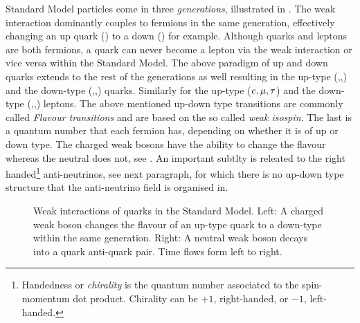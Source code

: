 Standard Model particles come in three {\it generations}, illustrated in .
The weak interaction dominantly couples to fermions in the same generation, effectively changing an up quark (\uquark) to a down (\dquark) for example.
Although quarks and leptons are both fermions, a quark can never become a lepton via the weak interaction or vice versa within the Standard Model.
The above paradigm of up and down quarks extends to the rest of the generations as well resulting in the up-type (\uquark,\cquark,\tquark)
and the down-type (\dquark,\squark,\bquark) quarks. Similarly for the  up-type ($e,\mu,\tau$) and the down-type (\neue,\neum,\neut)
leptons. The above mentioned up-down type transitions are commonly called {\it Flavour transitions} and are based on the so called
{\it weak isospin}. The last is a quantum number that each fermion has, depending on whether it is of up or down type.
The charged weak bosons \Wpm have the ability to change the flavour whereas the neutral \Z  does not, see .
An important subtlty is releated to the right handed\footnote{Handedness or {\it chirality} is the quantum number associated to the
spin-momentum dot product. Chirality can be $+1$, right-handed, or $-1$, left-handed. } anti-neutrinos, see next paragraph,
for which there is no up-down type structure that the anti-neutrino field is organised in.

\begin{figure}[h!]
  \centering
  {\sffamily }
  \caption{Weak interactions of quarks in the Standard Model. Left: A charged weak boson changes the flavour
           of an up-type quark to a down-type within the same generation.
           Right: A neutral weak boson decays into a quark anti-quark pair. Time flows form left to right.}
  \label{WeakInteractions}
\end{figure}

